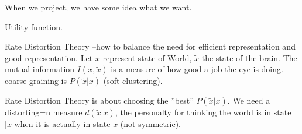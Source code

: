 \documentclass[]{article}
\begin{document}
When we project, we have some idea what we want.

Utility function.

Rate Distortion Theory --how to balance the need for efficient representation and good representation. Let ${x}$ represent state of World, ${\tilde{x}}$ the state of the brain. The mutual information $I(x,\tilde{x})$ is a measure of how good a job the eye is doing. coarse-graining is $P(\tilde{x}\vert x)$ (soft clustering).

Rate Distortion Theory is about choosing the ''best'' $P(\tilde{x}\vert x)$. We need a distorting=n measure $d(\tilde{x}\vert x)$, the personalty for thinking the world is in state $\vert x$ when it is actually in state $x$ (not symmetric).

\printglossaries




\end{document}
